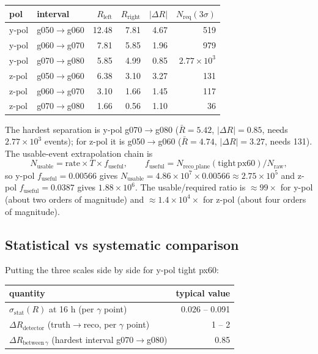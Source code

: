 \documentclass[a4paper,11pt]{article}
\begin{document}
\begin{table}[H]
\centering
\begin{tabular}{llrrrr}
\toprule
pol & interval & $R_{\mathrm{left}}$ & $R_{\mathrm{right}}$ & $|\Delta R|$ & $N_{\mathrm{req}}(3\sigma)$ \\
\midrule
y-pol & g050$\to$g060 & 12.48 & 7.81 & 4.67 & 519 \\
y-pol & g060$\to$g070 & 7.81 & 5.85 & 1.96 & 979 \\
y-pol & g070$\to$g080 & 5.85 & 4.99 & 0.85 & $2.77\times10^3$ \\
z-pol & g050$\to$g060 & 6.38 & 3.10 & 3.27 & 131 \\
z-pol & g060$\to$g070 & 3.10 & 1.66 & 1.45 & 117 \\
z-pol & g070$\to$g080 & 1.66 & 0.56 & 1.10 & 36 \\
\bottomrule
\end{tabular}
\end{table}

The hardest separation is y-pol g070$\to$g080 ($\bar R=5.42$, $|\Delta R|=0.85$, needs $2.77\times10^3$ events); for z-pol it is g050$\to$g060 ($\bar R=4.74$, $|\Delta R|=3.27$, needs 131). The usable-event extrapolation chain is
\[
  N_{\mathrm{usable}} = \mathrm{rate}\times T \times f_{\mathrm{useful}}, \qquad
  f_{\mathrm{useful}} = N_{\mathrm{reco\_plane}}(\mathrm{tight\,px60})/N_{\mathrm{raw}},
\]
so y-pol $f_{\mathrm{useful}}=0.00566$ gives $N_{\mathrm{usable}}=4.86\times10^7\times0.00566\approx2.75\times10^5$ and z-pol $f_{\mathrm{useful}}=0.0387$ gives $1.88\times10^6$. The usable/required ratio is $\approx 99\times$ for y-pol (about two orders of magnitude) and $\approx 1.4\times10^4\times$ for z-pol (about four orders of magnitude).

\subsection{Statistical vs systematic comparison}

Putting the three scales side by side for y-pol tight px60:

\begin{table}[H]
\centering
\begin{tabular}{lr}
\toprule
quantity & typical value \\
\midrule
$\sigma_{\mathrm{stat}}(R)$ at 16 h (per $\gamma$ point) & 0.026 -- 0.091 \\
$\Delta R_{\mathrm{detector}}$ (truth$\to$reco, per $\gamma$ point) & 1 -- 2 \\
$\Delta R_{\mathrm{between}\,\gamma}$ (hardest interval g070$\to$g080) & 0.85 \\
\bottomrule
\end{tabular}
\end{table}
\end{document}
